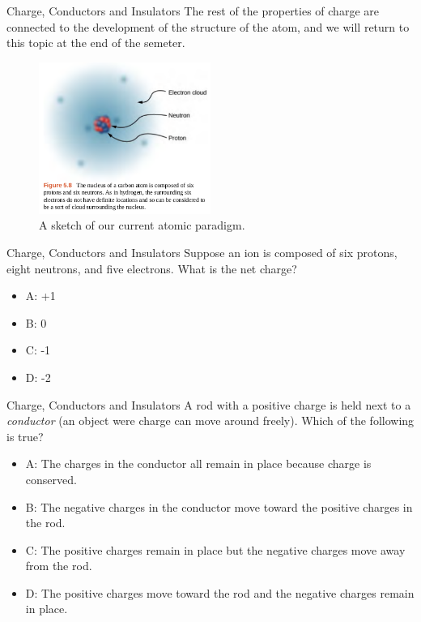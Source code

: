 \documentclass{beamer}
\begin{document}
\begin{frame}{Charge, Conductors and Insulators}
The rest of the properties of charge are connected to the development of the structure of the atom, and we will return to this topic at the end of the semeter.
\begin{figure}
\centering
\includegraphics[width=0.5\textwidth]{figures/atom.png}
\caption{\label{fig:atom} A sketch of our current atomic paradigm.}
\end{figure}
\end{frame}

\begin{frame}{Charge, Conductors and Insulators}
Suppose an ion is composed of six protons, eight neutrons, and five electrons.  What is the net charge?
\begin{itemize}
\item A: +1
\item B: 0
\item C: -1
\item D: -2
\end{itemize}
\end{frame}

\begin{frame}{Charge, Conductors and Insulators}
A rod with a positive charge is held next to a \textit{conductor} (an object were charge can move around freely).  Which of the following is true?
\begin{itemize}
\item A: The charges in the conductor all remain in place because charge is conserved.
\item B: The negative charges in the conductor move toward the positive charges in the rod.
\item C: The positive charges remain in place but the negative charges move away from the rod.
\item D: The positive charges move toward the rod and the negative charges remain in place.
\end{itemize}
\end{frame}
\end{document}
